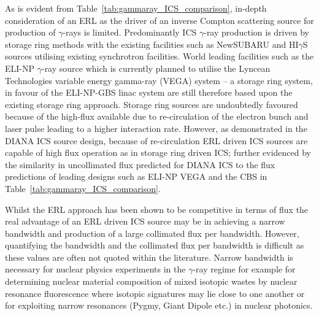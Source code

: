 \documentclass[../main.tex]{subfiles}
\begin{document}
As is evident from Table~\ref{tab:gammaray_ICS_comparison}, in-depth consideration of an ERL as the driver of an inverse Compton scattering source for production of $\gamma$-rays is limited. Predominantly ICS $\gamma$-ray production is driven by storage ring methods with the existing facilities such as NewSUBARU \cite{utsunomiya2015gamma} and HI$\gamma$S \cite{weller2009research} sources utilising existing synchrotron facilities. World leading facilities such as the ELI-NP $\gamma$-ray source which is currently planned to utilise the Lyncean Technologies variable energy gamma-ray (VEGA) system \cite{tanaka2020current,elinp2019vega} -- a storage ring system, in favour of the ELI-NP-GBS \cite{adriani2014technical}linac system are still therefore based upon the existing storage ring approach. Storage ring sources are undoubtedly favoured because of the high-flux available due to re-circulation of the electron bunch and laser pulse leading to a higher interaction rate. However, as demonstrated in the DIANA ICS source design, because of re-circulation ERL driven ICS sources are capable of high flux operation as in storage ring driven ICS; further evidenced by the similarity in uncollimated flux predicted for DIANA ICS to the flux predictions of leading designs such as ELI-NP VEGA and the CBS \cite{pan2019design} in Table~\ref{tab:gammaray_ICS_comparison}. 

Whilst the ERL approach has been shown to be competitive in terms of flux the real advantage of an ERL driven ICS source may be in achieving a narrow bandwidth and production of a large collimated flux per bandwidth. However, quantifying the bandwidth and the collimated flux per bandwidth is difficult as these values are often not quoted within the literature. Narrow bandwidth is necessary for nuclear physics experiments in the $\gamma$-ray regime for example for determining nuclear material composition of mixed isotopic wastes by nuclear resonance fluorescence where isotopic signatures may lie close to one another or for exploiting narrow resonances (Pygmy, Giant Dipole etc.) in nuclear photonics. 
\end{document}
